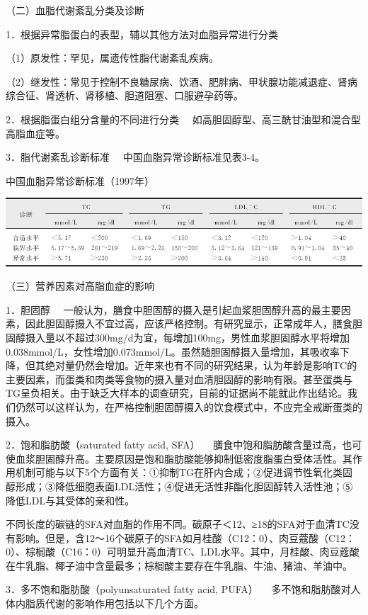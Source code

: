 （二）血脂代谢紊乱分类及诊断

{1．根据异常脂蛋白的表型，辅以其他方法对血脂异常进行分类}

（1）原发性：罕见，属遗传性脂代谢紊乱疾病。

（2）继发性：常见于控制不良糖尿病、饮酒、肥胖病、甲状腺功能减退症、肾病综合征、肾透析、肾移植、胆道阻塞、口服避孕药等。

{2．根据脂蛋白组分含量的不同进行分类}
　如高胆固醇型、高三酰甘油型和混合型高脂血症等。

{3．脂代谢紊乱诊断标准} 　中国血脂异常诊断标准见表3-4。

\begin{table}[htbp]
\centering
\caption{中国血脂异常诊断标准（1997年）}
\label{tab3-4}
\includegraphics{./images/Image00019.jpg}
\end{table}

（三）营养因素对高脂血症的影响

{1．胆固醇}
　一般认为，膳食中胆固醇的摄入是引起血浆胆固醇升高的最主要因素，因此胆固醇摄入不宜过高，应该严格控制。有研究显示，正常成年人，膳食胆固醇摄入量以不超过300mg/d为宜，每增加100mg，男性血浆胆固醇水平将增加0.038mmol/L，女性增加0.073mmol/L。虽然随胆固醇摄入量增加，其吸收率下降，但其绝对量仍然会增加。近年来也有不同的研究结果，认为年龄是影响TC的主要因素，而蛋类和肉类等食物的摄入量对血清胆固醇的影响有限。甚至蛋类与TG呈负相关。由于缺乏大样本的调查研究，目前的证据尚不能就此作出结论。我们仍然可以这样认为，在严格控制胆固醇摄入的饮食模式中，不应完全戒断蛋类的摄入。

{2．饱和脂肪酸（saturated fatty acid, SFA）}
　膳食中饱和脂肪酸含量过高，也可使血浆胆固醇升高。主要原因是饱和脂肪酸能够抑制低密度脂蛋白受体活性。其作用机制可能与以下5个方面有关：①抑制TG在肝内合成；②促进调节性氧化类固醇形成；③降低细胞表面LDL活性；④促进无活性非酯化胆固醇转入活性池；⑤降低LDL与其受体的亲和性。

不同长度的碳链的SFA对血脂的作用不同。碳原子＜12、≥18的SFA对于血清TC没有影响。但是，含12～16个碳原子的SFA如月桂酸（C12：0）、肉豆蔻酸（C12：0）、棕榈酸（C16：0）可明显升高血清TC、LDL水平。其中，月桂酸、肉豆蔻酸在牛乳脂、椰子油中含量最多；棕榈酸主要存在牛乳脂、牛油、猪油、羊油中。

{3．多不饱和脂肪酸（polyunsaturated fatty acid, PUFA）}
　多不饱和脂肪酸对人体内脂质代谢的影响作用包括以下几个方面。


